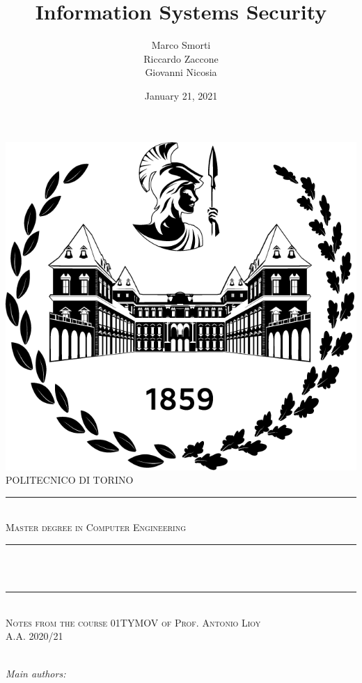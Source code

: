\documentclass[11pt]{report}
\title{Information Systems Security}				        %
\author{Marco Smorti \\ Riccardo Zaccone \\ Giovanni Nicosia}   %
\date{January 21, 2021}								    %
\makeatletter
\let\thetitle\@title
\let\theauthor\@author
\makeatother
\begin{document}

\begin{titlepage}
	\centering
	\includegraphics[scale=0.6]{logoPoli.png}\\[1.0 cm]				
	\textsc{\LARGE POLITECNICO DI TORINO}\\[-0.2 cm]		%
	\rule{\linewidth}{0.2 mm} \\
	\textsc{\large Master degree in Computer Engineering}\\[1.0 cm]		
	\rule{\linewidth}{0.2 mm} \\[0.4 cm]
	{ \huge \bfseries \thetitle}\\
	\rule{\linewidth}{0.2 mm} \\%
	\textsc{\Large Notes from the course 01TYMOV of Prof. Antonio Lioy \\ A.A. 2020/21}\\[0 cm]	
	\textsc{}\\[0.4 cm]
	
	\begin{minipage}{0.4\textwidth}
		\begin{flushleft} \large
			\emph{Main authors:}\\
			\theauthor
			\end{flushleft}
			\end{minipage}~
			\begin{minipage}{0.4\textwidth}
			\begin{flushright} \large
		\end{flushright}
	\end{minipage}\\[1.0 cm]




\end{titlepage}
\end{document}
